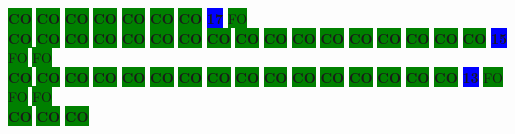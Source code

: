 \colorbox{green}{\color[rgb]{0,0,0}\textbf{CO}}%
\colorbox{green}{\color[rgb]{0,0,0}\textbf{CO}}%
\colorbox{green}{\color[rgb]{0,0,0}\textbf{CO}}%
\colorbox{green}{\color[rgb]{0,0,0}\textbf{CO}}%
\colorbox{green}{\color[rgb]{0,0,0}\textbf{CO}}%
\colorbox{green}{\color[rgb]{0,0,0}\textbf{CO}}%
\colorbox{green}{\color[rgb]{0,0,0}\textbf{CO}}%
\colorbox{blue}{\color[rgb]{1,0,0}\textbf{17}}%
\colorbox{green}{\color[gray]{0.75}FO}%
\\
\colorbox{green}{\color[rgb]{0,0,0}\textbf{CO}}%
\colorbox{green}{\color[rgb]{0,0,0}\textbf{CO}}%
\colorbox{green}{\color[rgb]{0,0,0}\textbf{CO}}%
\colorbox{green}{\color[rgb]{0,0,0}\textbf{CO}}%
\colorbox{green}{\color[rgb]{0,0,0}\textbf{CO}}%
\colorbox{green}{\color[rgb]{0,0,0}\textbf{CO}}%
\colorbox{green}{\color[rgb]{0,0,0}\textbf{CO}}%
\colorbox{green}{\color[rgb]{0,0,0}\textbf{CO}}%
\colorbox{green}{\color[rgb]{0,0,0}\textbf{CO}}%
\colorbox{green}{\color[rgb]{0,0,0}\textbf{CO}}%
\colorbox{green}{\color[rgb]{0,0,0}\textbf{CO}}%
\colorbox{green}{\color[rgb]{0,0,0}\textbf{CO}}%
\colorbox{green}{\color[rgb]{0,0,0}\textbf{CO}}%
\colorbox{green}{\color[rgb]{0,0,0}\textbf{CO}}%
\colorbox{green}{\color[rgb]{0,0,0}\textbf{CO}}%
\colorbox{green}{\color[rgb]{0,0,0}\textbf{CO}}%
\colorbox{green}{\color[rgb]{0,0,0}\textbf{CO}}%
\colorbox{blue}{\color[rgb]{1,0,0}\textbf{15}}%
\colorbox{green}{\color[gray]{0.75}FO}%
\colorbox{green}{\color[gray]{0.75}FO}%
\\
\colorbox{green}{\color[rgb]{0,0,0}\textbf{CO}}%
\colorbox{green}{\color[rgb]{0,0,0}\textbf{CO}}%
\colorbox{green}{\color[rgb]{0,0,0}\textbf{CO}}%
\colorbox{green}{\color[rgb]{0,0,0}\textbf{CO}}%
\colorbox{green}{\color[rgb]{0,0,0}\textbf{CO}}%
\colorbox{green}{\color[rgb]{0,0,0}\textbf{CO}}%
\colorbox{green}{\color[rgb]{0,0,0}\textbf{CO}}%
\colorbox{green}{\color[rgb]{0,0,0}\textbf{CO}}%
\colorbox{green}{\color[rgb]{0,0,0}\textbf{CO}}%
\colorbox{green}{\color[rgb]{0,0,0}\textbf{CO}}%
\colorbox{green}{\color[rgb]{0,0,0}\textbf{CO}}%
\colorbox{green}{\color[rgb]{0,0,0}\textbf{CO}}%
\colorbox{green}{\color[rgb]{0,0,0}\textbf{CO}}%
\colorbox{green}{\color[rgb]{0,0,0}\textbf{CO}}%
\colorbox{green}{\color[rgb]{0,0,0}\textbf{CO}}%
\colorbox{green}{\color[rgb]{0,0,0}\textbf{CO}}%
\colorbox{blue}{\color[rgb]{1,0,0}\textbf{13}}%
\colorbox{green}{\color[gray]{0.75}FO}%
\colorbox{green}{\color[gray]{0.75}FO}%
\colorbox{green}{\color[gray]{0.75}FO}%
\\
\colorbox{green}{\color[rgb]{0,0,0}\textbf{CO}}%
\colorbox{green}{\color[rgb]{0,0,0}\textbf{CO}}%
\colorbox{green}{\color[rgb]{0,0,0}\textbf{CO}}%

